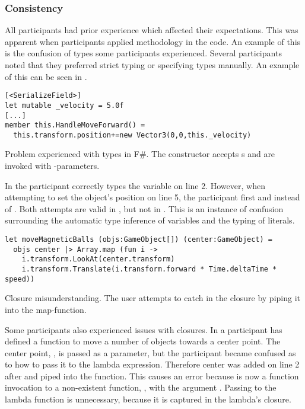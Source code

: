 \subsubsection{Consistency}\label{sec:part-cons} %
All participants had prior \cs experience which affected their expectations. This was apparent when participants applied \cs methodology in the \fs code. An example of this is the confusion of types some participants experienced. Several participants noted that they preferred strict typing or specifying types manually. An example of this can be seen in .

\begin{listing}[H]
\begin{verbatim}
[<SerializeField>]
let mutable _velocity = 5.0f
[...]
member this.HandleMoveForward() =
  this.transform.position+=new Vector3(0,0,this._velocity)
\end{verbatim}
\caption{Problem experienced with types in F\#. The  constructor accepts s and are invoked with -parameters.}
\label{lst:type-conf}
\end{listing}

In  the participant correctly types the  variable on line 2. However, when attempting to set the object's position on line 5, the participant first  and  instead of . Both attempts are valid in \cs, but not in \fs. This is an instance of confusion surrounding the automatic type inference of variables and the typing of literals.

\begin{listing}[H]
\begin{verbatim}
let moveMagneticBalls (objs:GameObject[]) (center:GameObject) =
  objs center |> Array.map (fun i ->
    i.transform.LookAt(center.transform)
    i.transform.Translate(i.transform.forward * Time.deltaTime * speed))
\end{verbatim}
\caption{Closure misunderstanding. The user attempts to catch  in the closure by piping it into the map-function.}
\label{lst:clos-mis}
\end{listing}

Some participants also experienced issues with closures. In  a participant has defined a function to move a number of objects towards a center point. The center point, , is passed as a parameter, but the participant became confused as to how to pass it to the lambda expression. Therefore center was added on line 2 after  and piped into the  function. This causes an error because  is now a function invocation to a non-existent function, , with the argument . Passing  to the lambda function is unnecessary, because it is captured in the lambda's closure.

